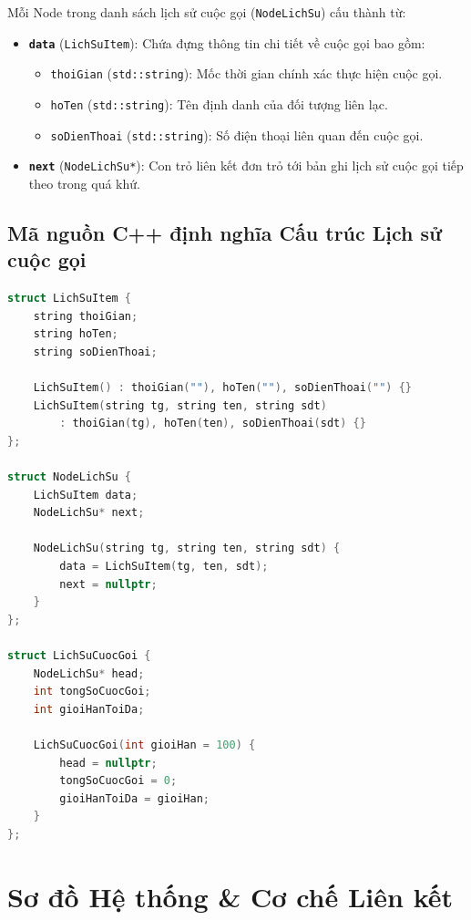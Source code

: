 Mỗi Node trong danh sách lịch sử cuộc gọi (\texttt{NodeLichSu}) cấu thành từ:
\begin{itemize}
    \item \textbf{\texttt{data}} (\texttt{LichSuItem}): Chứa đựng thông tin chi tiết về cuộc gọi bao gồm:
    \begin{itemize}
        \item \texttt{thoiGian} (\texttt{std::string}): Mốc thời gian chính xác thực hiện cuộc gọi.
        \item \texttt{hoTen} (\texttt{std::string}): Tên định danh của đối tượng liên lạc.
        \item \texttt{soDienThoai} (\texttt{std::string}): Số điện thoại liên quan đến cuộc gọi.
    \end{itemize}
    \item \textbf{\texttt{next}} (\texttt{NodeLichSu*}): Con trỏ liên kết đơn trỏ tới bản ghi lịch sử cuộc gọi tiếp theo trong quá khứ.
\end{itemize}

\subsection{Mã nguồn C++ định nghĩa Cấu trúc Lịch sử cuộc gọi}

\begin{lstlisting}[language=C++, caption={Định nghĩa cấu trúc dữ liệu mô-đun Lịch sử cuộc gọi bằng C++}]
struct LichSuItem {
    string thoiGian;
    string hoTen;
    string soDienThoai;

    LichSuItem() : thoiGian(""), hoTen(""), soDienThoai("") {}
    LichSuItem(string tg, string ten, string sdt) 
        : thoiGian(tg), hoTen(ten), soDienThoai(sdt) {}
};

struct NodeLichSu {
    LichSuItem data;
    NodeLichSu* next;

    NodeLichSu(string tg, string ten, string sdt) {
        data = LichSuItem(tg, ten, sdt);
        next = nullptr;
    }
};

struct LichSuCuocGoi {
    NodeLichSu* head;
    int tongSoCuocGoi;
    int gioiHanToiDa;

    LichSuCuocGoi(int gioiHan = 100) {
        head = nullptr;
        tongSoCuocGoi = 0;
        gioiHanToiDa = gioiHan;
    }
};
\end{lstlisting}

\section{Sơ đồ Hệ thống \& Cơ chế Liên kết}

